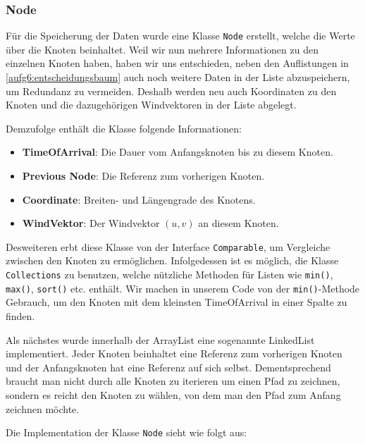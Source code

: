 

\subsubsection{Node}
Für die Speicherung der Daten wurde eine Klasse \texttt{Node} erstellt, welche die
Werte über die Knoten beinhaltet. Weil wir nun mehrere Informationen zu den
einzelnen Knoten haben, haben wir uns entschieden, neben den Auflistungen in
\ref{aufg6:entscheidungsbaum} auch noch weitere Daten in der Liste
abzuspeichern, um Redundanz zu vermeiden. Deshalb werden neu auch Koordinaten
zu den Knoten und die dazugehörigen Windvektoren in der Liste abgelegt.

Demzufolge enthält die Klasse folgende Informationen:

\begin{itemize}
\item \textbf{TimeOfArrival}: Die Dauer vom Anfangsknoten bis zu diesem Knoten.
\item \textbf{Previous Node}: Die Referenz zum vorherigen Knoten.
\item \textbf{Coordinate}: Breiten- und Längengrade des Knotens.
\item \textbf{WindVektor}: Der Windvektor $(u, v)$ an diesem Knoten.
\end{itemize}

Desweiteren erbt diese Klasse von der Interface \texttt{Comparable}, um Vergleiche
zwischen den Knoten zu ermöglichen. Infolgedessen ist es möglich, die Klasse
\texttt{Collections} zu benutzen, welche nützliche Methoden für Listen wie \texttt{min()},
\texttt{max()}, \texttt{sort()} etc. enthält. Wir machen in unserem Code von der
\texttt{min()}-Methode Gebrauch, um den Knoten mit dem kleinsten TimeOfArrival in
einer Spalte zu finden.

Als nächstes wurde innerhalb der ArrayList eine sogenannte LinkedList
implementiert. Jeder Knoten beinhaltet eine Referenz zum vorherigen Knoten und
der Anfangsknoten hat eine Referenz auf sich selbst. Dementsprechend braucht
man nicht durch alle Knoten zu iterieren um einen Pfad zu zeichnen, sondern es
reicht den Knoten zu wählen, von dem man den Pfad zum Anfang zeichnen möchte.

Die Implementation der Klasse \texttt{Node} sieht wie folgt aus:




